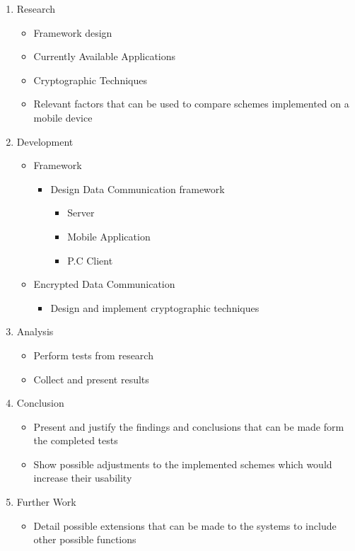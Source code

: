 \documentclass[a4paper,10pt]{report}
\begin{document}
\begin{enumerate}
  \item Research
  \begin{itemize}
    \item Framework design
    \item Currently Available Applications
    \item Cryptographic Techniques
    \item Relevant factors that can be used to compare schemes implemented on a mobile device
  \end{itemize}
  \item Development
  \begin{itemize}
    \item Framework
    \begin{itemize} 
      \item Design Data Communication framework
      \begin{itemize}
        \item Server
        \item Mobile Application
        \item P.C Client
      \end{itemize}
    \end{itemize}
  \item Encrypted Data Communication
  \begin{itemize}
    \item Design and implement cryptographic techniques
  \end{itemize}
  \end{itemize}
  \item Analysis
  \begin{itemize}
    \item Perform tests from research
    \item Collect and present results
  \end{itemize}
  \item Conclusion
  \begin{itemize}
    \item Present and justify the findings and conclusions that can be made form the completed tests
    \item Show possible adjustments to the implemented schemes which would increase their usability
  \end{itemize}
  \item Further Work
  \begin{itemize}
    \item Detail possible extensions that can be made to the systems to include other possible functions
  \end{itemize}
\end{enumerate}
\end{document}
